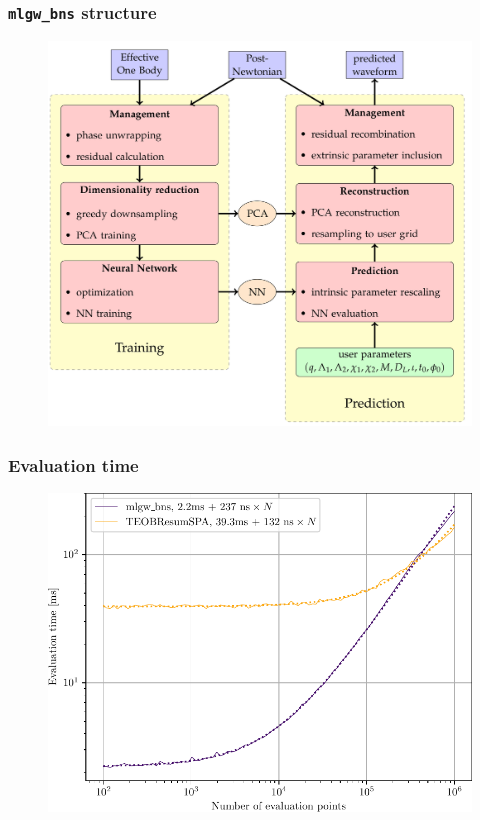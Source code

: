 \documentclass{beamer}
\begin{document}
\begin{frame}
    \frametitle{\texttt{mlgw\_bns} structure}
    \vspace*{-.3cm}
    \begin{figure}[ht]
    \centering
    \includegraphics[width=.775\textwidth]{figures/flowchart}
    \label{fig:flowchart}
    \end{figure}
\end{frame}

\begin{frame}
    \frametitle{Evaluation time}
    \begin{figure}[ht]
    \centering
    \includegraphics[width=.85\textwidth]{figures/benchmarking_evaluation}
    \label{fig:benchmarking_evaluation}
    \end{figure}
\end{frame}
\end{document}
